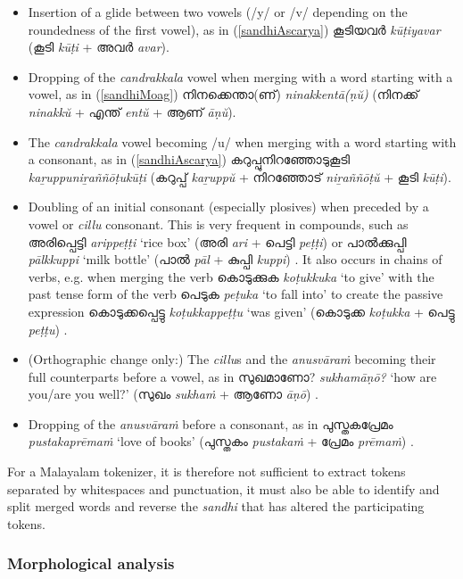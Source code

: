 \documentclass[a4paper]{article}
\begin{document}
\begin{itemize}
\item Insertion of a glide between two vowels (/y/ or /v/ depending on the roundedness of the first vowel), as in (\ref{sandhiAscarya}) കൂടിയവർ \textit{kūṭiyavar} (കൂടി \textit{kūṭi} + അവർ \textit{avar}).
\item Dropping of the \textit{candrakkala} vowel when merging with a word starting with a vowel, as in (\ref{sandhiMoag}) നിനക്കെന്താ(ണ്) \textit{ninakkentā(ṇŭ)} (നിനക്ക് \textit{ninakkŭ} + എന്ത് \textit{entŭ} + ആണ് \textit{āṇŭ}).
\item The \textit{candrakkala} vowel becoming /u/ when merging with a word starting with a consonant, as in (\ref{sandhiAscarya}) കറുപ്പുനിറഞ്ഞോടുകൂടി \textit{kaṟuppuniṟaññōṭukūṭi} (കറുപ്പ് \textit{kaṟuppŭ} + നിറഞ്ഞോട് \textit{niṟaññōṭŭ} + കൂടി \textit{kūṭi}).
\item Doubling of an initial consonant (especially plosives) when preceded by a vowel or \textit{cillu} consonant. This is very frequent in compounds, such as അരിപ്പെട്ടി \textit{arippeṭṭi} `rice box' (അരി \textit{ari} + പെട്ടി \textit{peṭṭi}) or പാൽക്കുപ്പി \textit{pālkkuppi} `milk bottle' (പാൽ \textit{pāl} + കുപ്പി \textit{kuppi}) \parencite[p.~397]{asherKumari}. It also occurs in chains of verbs, e.g. when merging the verb കൊടുക്കുക \textit{koṭukkuka} `to give' with the past tense form of the verb പെടുക \textit{peṭuka} `to fall into' to create the passive expression കൊടുക്കപ്പെട്ടു \textit{koṭukkappeṭṭu} `was given' (കൊടുക്ക \textit{koṭukka} + പെട്ടു \textit{peṭṭu}) \parencite[p.~269]{asherKumari}.
\item (Orthographic change only:) The \textit{cillu}s and the \textit{anusvāraṁ} becoming their full counterparts before a vowel, as in സുഖമാണോ? \textit{sukhamāṇō?} `how are you/are you well?' (സുഖം \textit{sukhaṁ} + ആണോ \textit{āṇō}) \parencite[p.~30]{moag}.
\item Dropping of the \textit{anusvāraṁ} before a consonant, as in പുസ്തകപ്രേമം \textit{pustakaprēmaṁ} `love of books' (പുസ്തകം \textit{pustakaṁ} + പ്രേമം \textit{prēmaṁ}) \parencite[p.~398]{asherKumari}.
\end{itemize}

For a Malayalam tokenizer, it is therefore not sufficient to extract tokens separated by whitespaces and punctuation, it must also be able to identify and split merged words and reverse the \textit{sandhi} that has altered the participating tokens.

\subsubsection{Morphological analysis}
\end{document}
